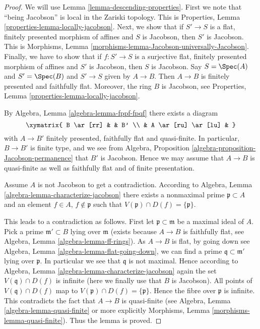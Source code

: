 \begin{proof}
We will use Lemma \ref{lemma-descending-properties}.
First we note that ``being Jacobson'' is local
in the Zariski topology. This is
Properties, Lemma \ref{properties-lemma-locally-jacobson}.
Next, we show that if $S' \to S$ is a flat, finitely presented
morphism of affines and $S$ is Jacobson, then $S'$ is
Jacobson. This is
Morphisms, Lemma \ref{morphisms-lemma-Jacobson-universally-Jacobson}.
Finally, we have to show that if $f : S' \to S$ is a surjective
flat, finitely presented morphism of affines and $S'$ is
Jacobson, then $S$ is Jacobson. Say $S = \Spec(A)$ and
$S' = \Spec(B)$ and $S' \to S$ given by $A \to B$.
Then $A \to B$ is finitely presented and faithfully flat.
Moreover, the ring $B$ is Jacobson, see
Properties, Lemma \ref{properties-lemma-locally-jacobson}.

\medskip\noindent
By Algebra, Lemma \ref{algebra-lemma-fppf-fpqf} there exists a diagram
$$
\xymatrix{
B \ar[rr] & & B' \\
& A \ar[ru] \ar[lu] &
}
$$
with $A \to B'$ finitely presented, faithfully flat and quasi-finite.
In particular, $B \to B'$ is finite type, and we see from
Algebra, Proposition \ref{algebra-proposition-Jacobson-permanence}
that $B'$ is Jacobson. Hence we may assume that $A \to B$ is quasi-finite
as well as faithfully flat and of finite presentation.

\medskip\noindent
Assume $A$ is not Jacobson to get a contradiction.
According to Algebra, Lemma \ref{algebra-lemma-characterize-jacobson}
there exists a nonmaximal prime $\mathfrak p \subset A$ and
an element $f \in A$, $f \not \in \mathfrak p$ such that
$V(\mathfrak p) \cap D(f) = \{\mathfrak p\}$.

\medskip\noindent
This leads to a contradiction as follows. First let
$\mathfrak p \subset \mathfrak m$ be a maximal ideal of $A$.
Pick a prime $\mathfrak m' \subset B$ lying over $\mathfrak m$
(exists because $A \to B$ is faithfully flat, see
Algebra, Lemma \ref{algebra-lemma-ff-rings}).
As $A \to B$ is flat, by going down see
Algebra, Lemma \ref{algebra-lemma-flat-going-down},
we can find a prime $\mathfrak q \subset \mathfrak m'$ lying over
$\mathfrak p$. In particular we see that $\mathfrak q$ is not
maximal. Hence according to
Algebra, Lemma \ref{algebra-lemma-characterize-jacobson} again
the set $V(\mathfrak q) \cap D(f)$ is infinite
(here we finally use that $B$ is Jacobson).
All points of $V(\mathfrak q) \cap D(f)$ map to
$V(\mathfrak p) \cap D(f) = \{\mathfrak p\}$. Hence the
fibre over $\mathfrak p$ is infinite. This contradicts the
fact that $A \to B$ is quasi-finite (see
Algebra, Lemma \ref{algebra-lemma-quasi-finite}
or more explicitly
Morphisms, Lemma \ref{morphisms-lemma-quasi-finite}).
Thus the lemma is proved.
\end{proof}






